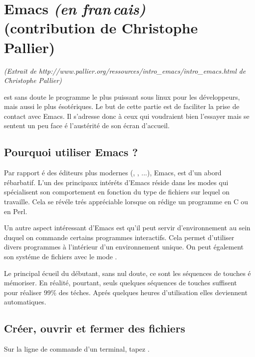 

\section{Emacs   \emph{(en fran\,cais)}  \\ \textnormal{(contribution de Christophe Pallier)} }\label{sec:emacs}


 \emph{ (Extrait de  http://www.pallier.org/ressources/intro\_emacs/intro\_emacs.html de Christophe Pallier) }

 est sans doute le  programme le plus
puissant sous linux pour les d\'eveloppeurs, mais aussi le plus \'esot\'eriques. Le but de cette partie est
de faciliter la prise de contact avec Emacs. Il s'adresse donc \`a
ceux qui voudraient bien l'essayer mais se sentent un peu
 face \'e l'aust\'erit\'e de son \'ecran d'accueil.



\subsection{Pourquoi utiliser Emacs ?}


Par rapport \'e des \'editeurs plus modernes (, , ...), Emacs, est d'un abord
r\'ebarbatif. L'un des principaux int\'er\'ets d'Emacs r\'eside dans les
modes qui sp\'ecialisent son comportement en fonction du type de
fichiers sur lequel on travaille. Cela se r\'ev\'ele tr\'es appr\'eciable
lorsque on r\'edige un programme en C ou en Perl.


Un autre aspect int\'eressant d'Emacs est qu'il peut servir
d'environnement au sein duquel on commande certains programmes
interactifs. Cela permet d'utiliser divers programmes \`a l'int\'erieur
d'un environnement unique. On peut \'egalement    son
syst\'eme de fichiers avec le mode .

Le principal \'ecueil du d\'ebutant, sans nul doute, ce sont les
s\'equences de touches \'e m\'emoriser. En r\'ealit\'e, pourtant, seuls quelques
 s\'equences de touches  suffisent pour r\'ealiser 99\% des t\'eches. Apr\'es quelques heures d'utilisation elles deviennent
automatiques.

\subsection{Cr\'eer, ouvrir et fermer des fichiers}

Sur la ligne de commande d'un terminal, tapez .

